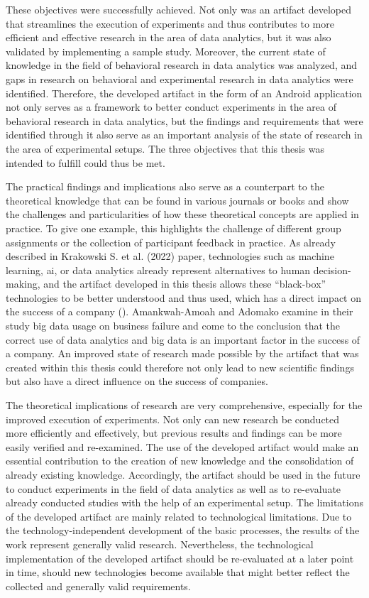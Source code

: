 These objectives were successfully achieved. Not only was an artifact developed that streamlines the execution of experiments and thus contributes to more efficient and effective research in the area of data analytics, but it was also validated by implementing a sample study. Moreover, the current state of knowledge in the field of behavioral research in data analytics was analyzed, and gaps in research on behavioral and experimental research in data analytics were identified. Therefore, the developed artifact in the form of an Android application not only serves as a framework to better conduct experiments in the area of behavioral research in data analytics, but the findings and requirements that were identified through it also serve as an important analysis of the state of research in the area of experimental setups. The three objectives that this thesis was intended to fulfill could thus be met.

The practical findings and implications also serve as a counterpart to the theoretical knowledge that can be found in various journals or books and show the challenges and particularities of how these theoretical concepts are applied in practice. To give one example, this highlights the challenge of different group assignments or the collection of participant feedback in practice. As already described in Krakowski S. et al. (2022) paper, technologies such as machine learning, \ac{ai}, or data analytics already represent alternatives to human decision-making, and the artifact developed in this thesis allows these \enquote{black-box} technologies to be better understood and thus used, which has a direct impact on the success of a company (\cite{Krakowski.2023}). Amankwah-Amoah and Adomako examine in their study big data usage on business failure and come to the conclusion that the correct use of data analytics and big data is an important factor in the success of a company. An improved state of research made possible by the artifact that was created within this thesis could therefore not only lead to new scientific findings but also have a direct influence on the success of companies.

The theoretical implications of research are very comprehensive, especially for the improved execution of experiments. Not only can new research be conducted more efficiently and effectively, but previous results and findings can be more easily verified and re-examined. The use of the developed artifact would make an essential contribution to the creation of new knowledge and the consolidation of already existing knowledge. Accordingly, the artifact should be used in the future to conduct experiments in the field of data analytics as well as to re-evaluate already conducted studies with the help of an experimental setup. The limitations of the developed artifact are mainly related to technological limitations. Due to the technology-independent development of the basic processes, the results of the work represent generally valid research. Nevertheless, the technological implementation of the developed artifact should be re-evaluated at a later point in time, should new technologies become available that might better reflect the collected and generally valid requirements.

